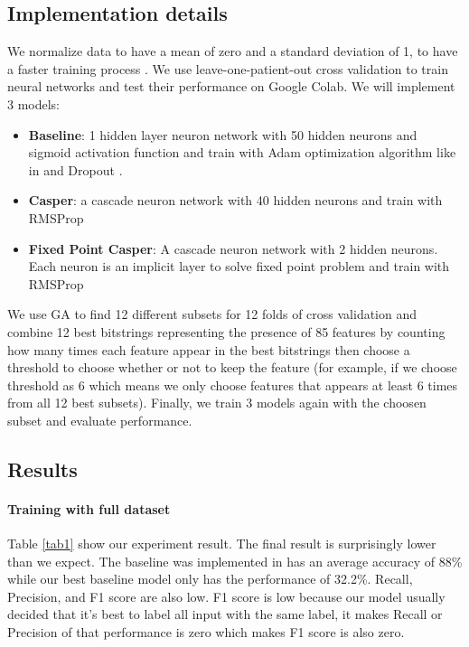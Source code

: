 \documentclass[runningheads]{llncs}
\begin{document}
\subsection{Implementation details}
We normalize data to have a mean of zero and a standard deviation of 1, to have a faster training process \cite{LeCun2012} \cite{NIPS2011_e836d813}. We use leave-one-patient-out cross validation to train neural networks and test their performance on Google Colab. We will implement 3 models:
\begin{itemize}
    \item \textbf{Baseline}: 1 hidden layer neuron network with 50 hidden neurons and sigmoid activation function and train with Adam optimization algorithm like in \cite{data_paper} and Dropout \cite{dropout}.
    \item \textbf{Casper}: a cascade neuron network with 40 hidden neurons and train with RMSProp
    \item \textbf{Fixed Point Casper}: A cascade neuron network with 2 hidden neurons. Each neuron is an implicit layer to solve fixed point problem and train with RMSProp
\end{itemize}
We use GA to find 12 different subsets for 12 folds of cross validation and combine 12 best bitstrings representing the presence of 85 features by counting how many times each feature appear in the best bitstrings then choose a threshold to choose whether or not to keep the feature (for example, if we choose threshold as $6$ which means we only choose features that appears at least 6 times from all 12 best subsets). Finally, we train 3 models again with the choosen subset and evaluate performance.

\subsection{Results}

\paragraph{\textbf{Training with full dataset}} Table \ref{tab1} show our experiment result. The final result is surprisingly lower than we expect. The baseline was implemented in \cite{data_paper} has an average accuracy of 88\% while our best baseline model only has the performance of 32.2\%. Recall, Precision, and F1 score are also low. F1 score is low because our model usually decided that it’s best to label all input with the same label, it makes Recall or Precision of that performance is zero which makes F1 score is also zero. 
\end{document}
